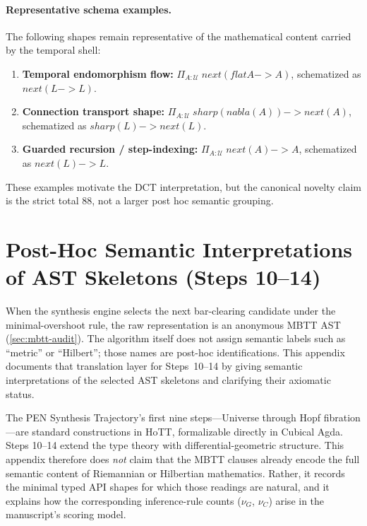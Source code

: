 \documentclass[11pt,a4paper]{article}
\def\to{->}%
\def\nabla{nabla}%
\def\flat{flat}%
\def\sharp{sharp}%
\def\bigcirc{next}%
\theoremstyle{plain}
\theoremstyle{definition}
\theoremstyle{remark}
\newcommand{\U}{\mathcal{U}}
\begin{document}
\paragraph{Representative schema examples.}
The following shapes remain representative of the mathematical content carried by the temporal shell:
\begin{enumerate}[nosep]
\item \textbf{Temporal endomorphism flow:} $\Pi_{A : \U}\; \bigcirc(\flat A \to A)$, schematized as $\bigcirc(L \to L)$.
\item \textbf{Connection transport shape:} $\Pi_{A : \U}\; \sharp(\nabla(A)) \to \bigcirc(A)$, schematized as $\sharp(L) \to \bigcirc(L)$.
\item \textbf{Guarded recursion / step-indexing:} $\Pi_{A : \U}\; \bigcirc(A) \to A$, schematized as $\bigcirc(L) \to L$.
\end{enumerate}
These examples motivate the DCT interpretation, but the canonical novelty claim is the strict total $88$, not a larger post hoc semantic grouping.

\section{Post-Hoc Semantic Interpretations of AST Skeletons (Steps 10--14)}
\label{app:formal-specs}

When the synthesis engine selects the next bar-clearing candidate under the minimal-overshoot rule, the raw representation is an anonymous MBTT AST (\cref{sec:mbtt-audit}).
The algorithm itself does not assign semantic labels such as ``metric'' or ``Hilbert''; those names are post-hoc identifications.
This appendix documents that translation layer for Steps~10--14 by giving semantic interpretations of the selected AST skeletons and clarifying their axiomatic status.

The PEN Synthesis Trajectory's first nine steps---Universe through Hopf fibration---are standard constructions in HoTT, formalizable directly in Cubical Agda.
Steps 10--14 extend the type theory with differential-geometric structure.
This appendix therefore does \emph{not} claim that the MBTT clauses already encode the full semantic content of Riemannian or Hilbertian mathematics.
Rather, it records the minimal typed API shapes for which those readings are natural, and it explains how the corresponding inference-rule counts ($\nu_G$, $\nu_C$) arise in the manuscript's scoring model.
\end{document}
